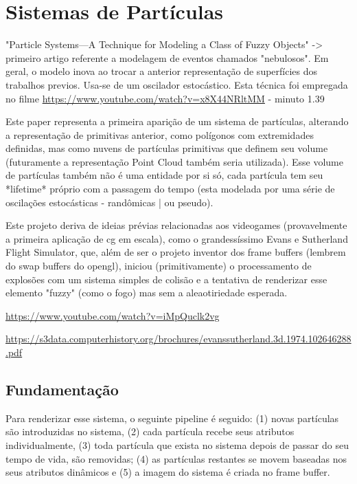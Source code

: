 \section{Sistemas de Partículas}

"Particle Systems—A Technique for Modeling a Class of Fuzzy Objects" -> primeiro artigo referente a modelagem de eventos chamados "nebulosos". Em geral, o modelo inova ao trocar a anterior representação de superfícies dos trabalhos previos. Usa-se de um oscilador estocástico. Esta técnica foi empregada no filme \href{Star Trek II: The Wrath f Khan}{https://www.youtube.com/watch?v=x8X44NRltMM} - minuto 1.39

Este paper representa a primeira aparição de um sistema de partículas, alterando a representação de primitivas anterior, como polígonos com extremidades definidas, mas como nuvens de partículas primitivas que definem seu volume (futuramente a representação Point Cloud também seria utilizada). Esse volume de partículas também não é uma entidade por si só, cada partícula tem seu *lifetime* próprio com a passagem do tempo (esta modelada por uma série de oscilações estocásticas - randômicas | ou pseudo). 

Este projeto deriva de ideias prévias relacionadas aos videogames (provavelmente a primeira aplicação de cg em escala), como o grandessíssimo Evans e Sutherland Flight Simulator, que, além de ser o projeto inventor dos frame buffers (lembrem do swap buffers do opengl), iniciou (primitivamente) o processamento de explosões com um sistema simples de colisão e a tentativa de renderizar esse elemento "fuzzy" (como o fogo) mas sem a aleaotiriedade esperada.

\href{evans e sutherland}{https://www.youtube.com/watch?v=iMpQuclk2vg}

\href{paper evans e sutherland}{https://s3data.computerhistory.org/brochures/evanssutherland.3d.1974.102646288.pdf}

\subsection{Fundamentação}
Para renderizar esse sistema, o seguinte pipeline é seguido: (1) novas partículas são introduzidas no sistema, (2) cada partícula recebe seus atributos individualmente, (3) toda partícula que exista no sistema depois de passar do seu tempo de vida, são removidas; (4) as partículas restantes se movem baseadas nos seus atributos dinâmicos e (5) a imagem do sistema é criada no frame buffer.

